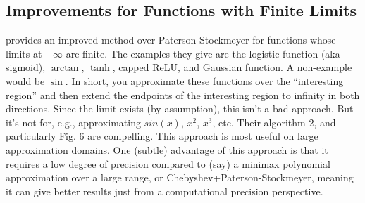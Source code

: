 \documentclass[../fheimpl.tex]{subfiles}
\begin{document}
	
	\subsection{Improvements for Functions with Finite Limits}
	\cite{cryptoeprint:2022/280} provides an improved method over Paterson-Stockmeyer for functions whose limits at $\pm\infty$  are finite. The examples they give are the logistic function (aka sigmoid), $\arctan$, $\tanh$, capped ReLU, and Gaussian function. A non-example would be $\sin$. 
	In short, you approximate these functions over the ``interesting region'' and then extend the endpoints of the interesting region to infinity in both directions. Since the limit exists (by assumption), this isn't a bad approach. But it's not for, e.g., approximating $sin(x)$, $x^2$, $x^3$, etc. Their algorithm 2, and particularly Fig. 6 are compelling. This approach is most useful on large approximation domains. One (subtle) advantage of this approach is that it requires a low degree of precision compared to (say) a minimax polynomial approximation over a large range, or Chebyshev+Paterson-Stockmeyer, meaning it can give better results just from a computational precision perspective.
	
	\ifcompileasbook
	\else
	\printbibliography
	\fi
	
\end{document}
